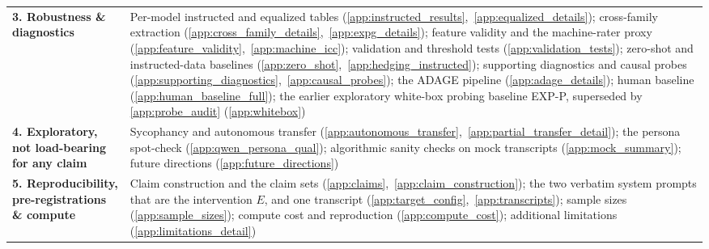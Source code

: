 \begin{table}[htbp]
\begin{scriptsize}
\begin{tabular}{@{}p{1.20in}p{4.00in}@{}}
\addlinespace[1.5pt]
\textbf{3. Robustness \& diagnostics} & Per-model instructed and equalized tables (\ref{app:instructed_results},~\ref{app:equalized_details}); cross-family extraction (\ref{app:cross_family_details},~\ref{app:expg_details}); feature validity and the machine-rater proxy (\ref{app:feature_validity},~\ref{app:machine_icc}); validation and threshold tests (\ref{app:validation_tests}); zero-shot and instructed-data baselines (\ref{app:zero_shot},~\ref{app:hedging_instructed}); supporting diagnostics and causal probes (\ref{app:supporting_diagnostics},~\ref{app:causal_probes}); the ADAGE pipeline (\ref{app:adage_details}); human baseline (\ref{app:human_baseline_full}); the earlier exploratory white-box probing baseline EXP-P, superseded by \ref{app:probe_audit} (\ref{app:whitebox}) \\
\addlinespace[1.5pt]
\textbf{4. Exploratory, not load-bearing for any claim} & Sycophancy and autonomous transfer (\ref{app:autonomous_transfer},~\ref{app:partial_transfer_detail}); the persona spot-check (\ref{app:qwen_persona_qual}); algorithmic sanity checks on mock transcripts (\ref{app:mock_summary}); future directions (\ref{app:future_directions}) \\
\addlinespace[1.5pt]
\textbf{5. Reproducibility, pre-registrations \& compute} & Claim construction and the claim sets (\ref{app:claims},~\ref{app:claim_construction}); the two verbatim system prompts that are the intervention $E$, and one transcript (\ref{app:target_config},~\ref{app:transcripts}); sample sizes (\ref{app:sample_sizes}); compute cost and reproduction (\ref{app:compute_cost}); additional limitations (\ref{app:limitations_detail}) \\
\bottomrule
\end{tabular}
\end{scriptsize}
\end{table}

